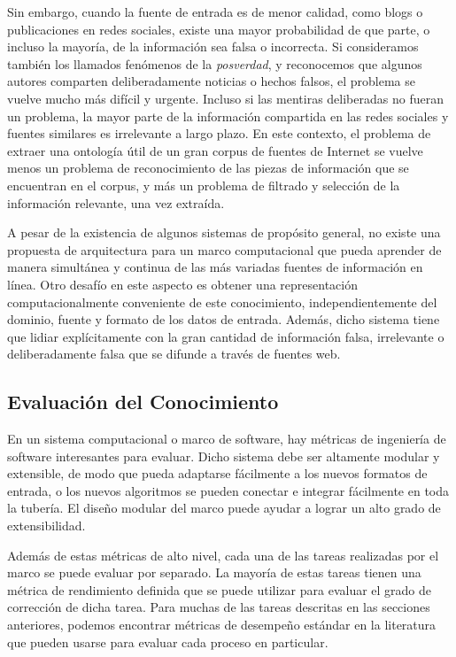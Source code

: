 Sin embargo, cuando la fuente de entrada es de menor calidad, como blogs o publicaciones en redes sociales, existe una mayor probabilidad de que parte, o incluso la mayoría, de la información sea falsa o incorrecta. Si consideramos también los llamados fenómenos de la \textit{posverdad}, y reconocemos que algunos autores comparten deliberadamente noticias o hechos falsos, el problema se vuelve mucho más difícil y urgente. Incluso si las mentiras deliberadas no fueran un problema, la mayor parte de la información compartida en las redes sociales y fuentes similares es irrelevante a largo plazo. En este contexto, el problema de extraer una ontología útil de un gran corpus de fuentes de Internet se vuelve menos un problema de reconocimiento de las piezas de información que se encuentran en el corpus, y más un problema de filtrado y selección de la información relevante, una vez extraída.

A pesar de la existencia de algunos sistemas de propósito general, no existe una propuesta de arquitectura para un marco computacional que pueda aprender de manera simultánea y continua de las más variadas fuentes de información en línea. Otro desafío en este aspecto es obtener una representación computacionalmente conveniente de este conocimiento, independientemente del dominio, fuente y formato de los datos de entrada. Además, dicho sistema tiene que lidiar explícitamente con la gran cantidad de información falsa, irrelevante o deliberadamente falsa que se difunde a través de fuentes web.

\subsection{Evaluación del Conocimiento}\label{sec: evaluación}

En un sistema computacional o marco de software, hay métricas de ingeniería de software interesantes para evaluar.
Dicho sistema debe ser altamente modular y extensible, de modo que pueda adaptarse fácilmente a los nuevos formatos de entrada, o los nuevos algoritmos se pueden conectar e integrar fácilmente en toda la tubería.
El diseño modular del marco puede ayudar a lograr un alto grado de extensibilidad.

Además de estas métricas de alto nivel, cada una de las tareas realizadas por el marco se puede evaluar por separado.
La mayoría de estas tareas tienen una métrica de rendimiento definida que se puede utilizar para evaluar el grado de corrección de dicha tarea.
Para muchas de las tareas descritas en las secciones anteriores, podemos encontrar métricas de desempeño estándar en la literatura que pueden usarse para evaluar cada proceso en particular.

